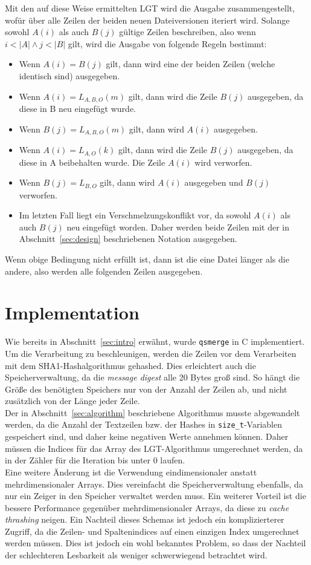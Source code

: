 \documentclass[a4paper,titlepage,12pt]{scrartcl}
\begin{document}
Mit den auf diese Weise ermittelten LGT wird die Ausgabe zusammengestellt,
wofür über alle Zeilen der beiden neuen Dateiversionen iteriert wird.
Solange sowohl $A(i)$ als auch $B(j)$ gültige Zeilen beschreiben,
also wenn $i < |A| \wedge j < |B|$ gilt,
wird die Ausgabe von folgende Regeln bestimmt:
\begin{itemize}
\item Wenn $A(i) = B(j)$ gilt,
dann wird eine der beiden Zeilen (welche identisch sind) ausgegeben.
\item Wenn $A(i) = L_{A,B,O}(m)$ gilt,
dann wird die Zeile $B(j)$ ausgegeben,
da diese in B neu eingefügt wurde.
\item Wenn $B(j) = L_{A,B,O}(m)$ gilt,
dann wird $A(i)$ ausgegeben.
\item Wenn $A(i) = L_{A,O}(k)$ gilt,
dann wird die Zeile $B(j)$ ausgegeben,
da diese in A beibehalten wurde.
Die Zeile $A(i)$ wird verworfen.
\item Wenn $B(j) = L_{B,O}$ gilt,
dann wird $A(i)$ ausgegeben und $B(j)$ verworfen.
\item Im letzten Fall liegt ein Verschmelzungskonflikt vor,
da sowohl $A(i)$ als auch $B(j)$ neu eingefügt worden.
Daher werden beide Zeilen mit der in Abschnitt~\ref{sec:design} beschriebenen Notation ausgegeben.
\end{itemize}
Wenn obige Bedingung nicht erfüllt ist,
dann ist die eine Datei länger als die andere,
also werden alle folgenden Zeilen ausgegeben.

\section{Implementation}
\label{sec:implementation}
Wie bereits in Abschnitt~\ref{sec:intro} erwähnt,
wurde \texttt{qsmerge} in C implementiert.
Um die Verarbeitung zu beschleunigen,
werden die Zeilen vor dem Verarbeiten mit dem SHA1-Hashalgorithmus gehashed.
Dies erleichtert auch die Speicherverwaltung,
da die \emph{message digest} alle 20 Bytes groß sind.
So hängt die Größe des benötigten Speichers nur von der Anzahl der Zeilen ab,
und nicht zusätzlich von der Länge jeder Zeile.
\\
Der in Abschnitt~\ref{sec:algorithm} beschriebene Algorithmus musste abgewandelt werden,
da die Anzahl der Textzeilen bzw. der Hashes in \texttt{size\_t}-Variablen gespeichert sind,
und daher keine negativen Werte annehmen können.
Daher müssen die Indices für das Array des LGT-Algorithmus umgerechnet werden,
da in \citet{web:eppstein} der Zähler für die Iteration bis unter 0 laufen.
\\
Eine weitere Änderung ist die Verwendung eindimensionaler anstatt mehrdimensionaler Arrays.
Dies vereinfacht die Speicherverwaltung ebenfalls,
da nur ein Zeiger in den Speicher verwaltet werden muss.
Ein weiterer Vorteil ist die bessere Performance gegenüber mehrdimensionaler Arrays,
da diese zu \emph{cache thrashing} neigen.
Ein Nachteil dieses Schemas ist jedoch ein komplizierterer Zugriff,
da die Zeilen- und Spaltenindices auf einen einzigen Index umgerechnet werden müssen.
Dies ist jedoch ein wohl bekanntes Problem,
so dass der Nachteil der schlechteren Lesbarkeit als weniger schwerwiegend betrachtet wird.
\end{document}
